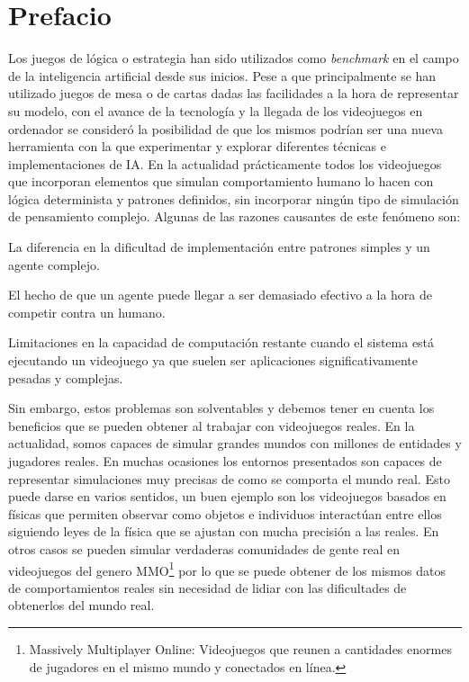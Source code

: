 \chapter{Prefacio}

Los juegos de lógica o estrategia han sido utilizados como {\it benchmark} en el campo de la inteligencia artificial desde sus inicios. Pese a que principalmente se han utilizado juegos de mesa o de cartas dadas las facilidades a la hora de representar su modelo, con el avance de la tecnología y la llegada de los videojuegos en ordenador se consideró la posibilidad de que los mismos podrían ser una nueva herramienta con la que experimentar y explorar diferentes técnicas e implementaciones de IA. En la actualidad prácticamente todos los videojuegos que incorporan elementos que simulan comportamiento humano lo hacen con lógica determinista y patrones definidos, sin incorporar ningún tipo de simulación de pensamiento complejo. Algunas de las razones causantes de este fenómeno son:

\begin{itemize}
{\item La diferencia en la dificultad de implementación entre patrones simples y un agente complejo.} 
{\item El hecho de que un agente puede llegar a ser demasiado efectivo a la hora de competir contra un humano.}
{\item Limitaciones en la capacidad de computación restante cuando el sistema está ejecutando un videojuego ya que suelen ser aplicaciones significativamente pesadas y complejas.}  
\end{itemize}


Sin embargo, estos problemas son solventables y debemos tener en cuenta los beneficios que se pueden obtener al trabajar con videojuegos reales. En la actualidad, somos capaces de simular grandes mundos con millones de entidades y jugadores reales. En muchas ocasiones los entornos presentados son capaces de representar simulaciones muy precisas de como se comporta el mundo real. Esto puede darse en varios sentidos, un buen ejemplo son los videojuegos basados en físicas que permiten observar como objetos e individuos interactúan entre ellos siguiendo leyes de la física que se ajustan con mucha precisión a las reales. En otros casos se pueden simular verdaderas comunidades de gente real en videojuegos del genero MMO\footnote{Massively Multiplayer Online: Videojuegos que reunen a cantidades enormes de jugadores en el mismo mundo y conectados en línea.} por lo que se puede obtener de los mismos datos de comportamientos reales sin necesidad de lidiar con las dificultades de obtenerlos del mundo real.

